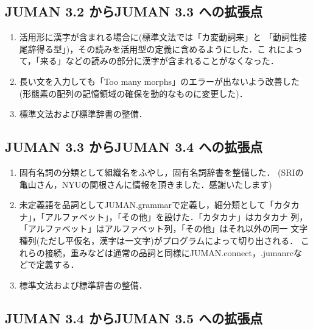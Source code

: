 \documentclass[a4j,titlepage]{jarticle}
\begin{document}
\subsection{JUMAN 3.2 からJUMAN 3.3 への拡張点}

\begin{enumerate}
\item 活用形に漢字が含まれる場合に(標準文法では「カ変動詞来」と
「動詞性接尾辞得る型」)，その読みを活用型の定義に含めるようにした．こ
れによって，「来る」などの読みの部分に漢字が含まれることがなくなった．

\item 長い文を入力しても「Too many morphs」のエラーが出ないよう改善した
  (形態素の配列の記憶領域の確保を動的なものに変更した)．

\item 標準文法および標準辞書の整備．

\end{enumerate}

\subsection{JUMAN 3.3 からJUMAN 3.4 への拡張点}

\begin{enumerate}
\item 固有名詞の分類として組織名をふやし，固有名詞辞書を整備した．
  (SRIの亀山さん，NYUの関根さんに情報を頂きました．感謝いたします)

\item 未定義語を品詞としてJUMAN.grammarで定義し，細分類として「カタカ
  ナ」，「アルファベット」，「その他」を設けた．「カタカナ」はカタカナ
  列，「アルファベット」はアルファベット列，「その他」はそれ以外の同一
  文字種列(ただし平仮名，漢字は一文字)がプログラムによって切り出される．
  これらの接続，重みなどは通常の品詞と同様にJUMAN.connect，.jumanrcな
  どで定義する．

\item 標準文法および標準辞書の整備．

\end{enumerate}

\subsection{JUMAN 3.4 からJUMAN 3.5 への拡張点}
\end{document}
